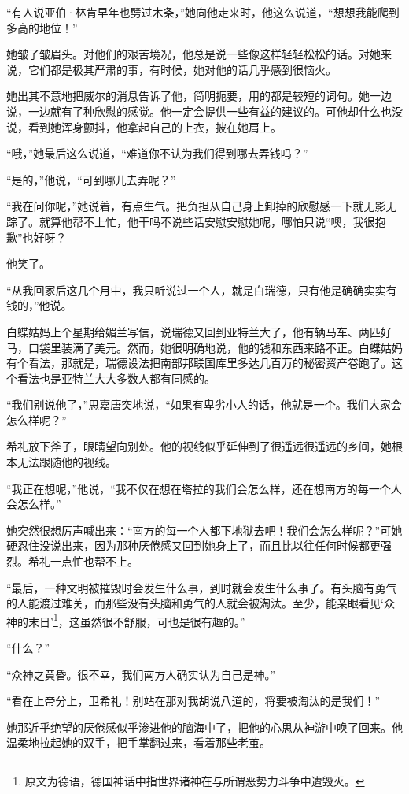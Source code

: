 \par “有人说亚伯·林肯早年也劈过木条，”她向他走来时，他这么说道，“想想我能爬到多高的地位！”
\par 她皱了皱眉头。对他们的艰苦境况，他总是说一些像这样轻轻松松的话。对她来说，它们都是极其严肃的事，有时候，她对他的话几乎感到很恼火。
\par 她出其不意地把威尔的消息告诉了他，简明扼要，用的都是较短的词句。她一边说，一边就有了种欣慰的感觉。他一定会提供一些有益的建议的。可他却什么也没说，看到她浑身颤抖，他拿起自己的上衣，披在她肩上。
\par “哦，”她最后这么说道，“难道你不认为我们得到哪去弄钱吗？”
\par “是的，”他说，“可到哪儿去弄呢？”
\par “我在问你呢，”她说着，有点生气。把负担从自己身上卸掉的欣慰感一下就无影无踪了。就算他帮不上忙，他干吗不说些话安慰安慰她呢，哪怕只说“噢，我很抱歉”也好呀？
\par 他笑了。
\par “从我回家后这几个月中，我只听说过一个人，就是白瑞德，只有他是确确实实有钱的，”他说。
\par 白蝶姑妈上个星期给媚兰写信，说瑞德又回到亚特兰大了，他有辆马车、两匹好马，口袋里装满了美元。然而，她很明确地说，他的钱和东西来路不正。白蝶姑妈有个看法，那就是，瑞德设法把南部邦联国库里多达几百万的秘密资产卷跑了。这个看法也是亚特兰大大多数人都有同感的。
\par “我们别说他了，”思嘉唐突地说，“如果有卑劣小人的话，他就是一个。我们大家会怎么样呢？”
\par 希礼放下斧子，眼睛望向别处。他的视线似乎延伸到了很遥远很遥远的乡间，她根本无法跟随他的视线。
\par “我正在想呢，”他说，“我不仅在想在塔拉的我们会怎么样，还在想南方的每一个人会怎么样。”
\par 她突然很想厉声喊出来：“南方的每一个人都下地狱去吧！我们会怎么样呢？”可她硬忍住没说出来，因为那种厌倦感又回到她身上了，而且比以往任何时候都更强烈。希礼一点忙也帮不上。
\par “最后，一种文明被摧毁时会发生什么事，到时就会发生什么事了。有头脑有勇气的人能渡过难关，而那些没有头脑和勇气的人就会被淘汰。至少，能亲眼看见‘众神的末日’\footnote{原文为德语，德国神话中指世界诸神在与所谓恶势力斗争中遭毁灭。}，这虽然很不舒服，可也是很有趣的。”
\par “什么？”
\par “众神之黄昏。很不幸，我们南方人确实认为自己是神。”
\par “看在上帝分上，卫希礼！别站在那对我胡说八道的，将要被淘汰的是我们！”
\par 她那近乎绝望的厌倦感似乎渗进他的脑海中了，把他的心思从神游中唤了回来。他温柔地拉起她的双手，把手掌翻过来，看着那些老茧。

